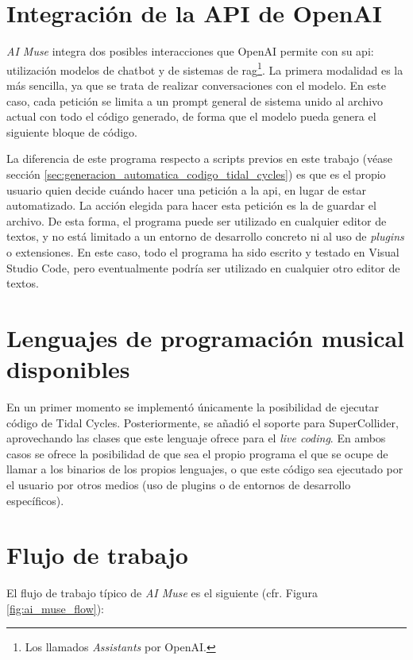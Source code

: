 \section{Integración de la API de OpenAI}

\emph{AI Muse} integra dos posibles interacciones que OpenAI permite con su \gls{api}: utilización modelos de chatbot y de sistemas de \gls{rag}\footnote{Los llamados \emph{Assistants} por OpenAI.}. La primera modalidad es la más sencilla, ya que se trata de realizar conversaciones con el modelo. En este caso, cada petición se limita a un prompt general de sistema unido al archivo actual con todo el código generado, de forma que el modelo pueda genera el siguiente bloque de código.

La diferencia de este programa respecto a scripts previos en este trabajo (véase sección \ref{sec:generacion_automatica_codigo_tidal_cycles}) es que es el propio usuario quien decide cuándo hacer una petición a la \gls{api}, en lugar de estar automatizado. La acción elegida para hacer esta petición es la de guardar el archivo. De esta forma, el programa puede ser utilizado en cualquier editor de textos, y no está limitado a un entorno de desarrollo concreto ni al uso de \emph{plugins} o extensiones. En este caso, todo el programa ha sido escrito y testado en Visual Studio Code, pero eventualmente podría ser utilizado en cualquier otro editor de textos.


\section{Lenguajes de programación musical disponibles}

En un primer momento se implementó únicamente la posibilidad de ejecutar código de Tidal Cycles. Posteriormente, se añadió el soporte para SuperCollider, aprovechando las clases que este lenguaje ofrece para el \emph{live coding}. En ambos casos se ofrece la posibilidad de que sea el propio programa el que se ocupe de llamar a los binarios de los propios lenguajes, o que este código sea ejecutado por el usuario por otros medios (uso de plugins o de entornos de desarrollo específicos).


\section{Flujo de trabajo}

El flujo de trabajo típico de \emph{AI Muse} es el siguiente (cfr. Figura \ref{fig:ai_muse_flow}):

